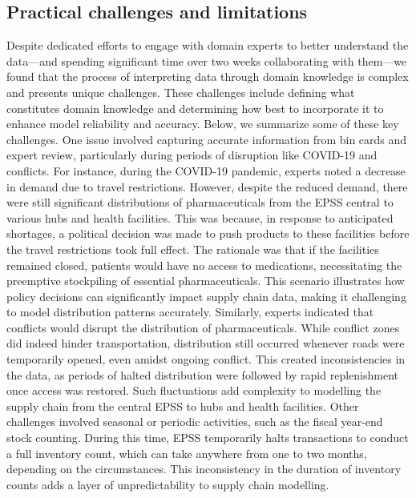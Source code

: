 \documentclass[
  authoryear,
  preprint,
  3p]{elsarticle}
\begin{document}
\subsection{Practical challenges and
limitations}\label{practical-challenges-and-limitations}

Despite dedicated efforts to engage with domain experts to better
understand the data---and spending significant time over two weeks
collaborating with them---we found that the process of interpreting data
through domain knowledge is complex and presents unique challenges.
These challenges include defining what constitutes domain knowledge and
determining how best to incorporate it to enhance model reliability and
accuracy. Below, we summarize some of these key challenges. One issue
involved capturing accurate information from bin cards and expert
review, particularly during periods of disruption like COVID-19 and
conflicts. For instance, during the COVID-19 pandemic, experts noted a
decrease in demand due to travel restrictions. However, despite the
reduced demand, there were still significant distributions of
pharmaceuticals from the EPSS central to various hubs and health
facilities. This was because, in response to anticipated shortages, a
political decision was made to push products to these facilities before
the travel restrictions took full effect. The rationale was that if the
facilities remained closed, patients would have no access to
medications, necessitating the preemptive stockpiling of essential
pharmaceuticals. This scenario illustrates how policy decisions can
significantly impact supply chain data, making it challenging to model
distribution patterns accurately. Similarly, experts indicated that
conflicts would disrupt the distribution of pharmaceuticals. While
conflict zones did indeed hinder transportation, distribution still
occurred whenever roads were temporarily opened, even amidst ongoing
conflict. This created inconsistencies in the data, as periods of halted
distribution were followed by rapid replenishment once access was
restored. Such fluctuations add complexity to modelling the supply chain
from the central EPSS to hubs and health facilities. Other challenges
involved seasonal or periodic activities, such as the fiscal year-end
stock counting. During this time, EPSS temporarily halts transactions to
conduct a full inventory count, which can take anywhere from one to two
months, depending on the circumstances. This inconsistency in the
duration of inventory counts adds a layer of unpredictability to supply
chain modelling.
\end{document}
